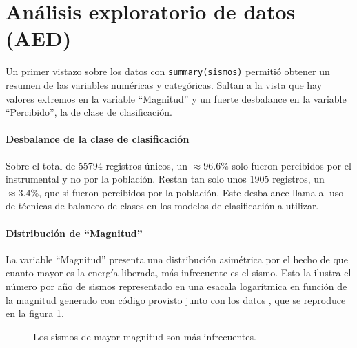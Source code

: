 \documentclass[a4paper]{report}
\begin{document}
\section{Análisis exploratorio de datos (AED)}\label{sec:AED}

Un primer vistazo sobre los datos con \verb'summary(sismos)' permitió obtener un resumen de las variables numéricas y categóricas.
Saltan a la vista que hay valores extremos en la variable ``Magnitud'' y un fuerte desbalance en la variable ``Percibido'', la de clase de clasificación.

\paragraph{Desbalance de la clase de clasificación}
Sobre el total de 55794 registros únicos, un \(\approx 96.6\%\) solo fueron percibidos por el instrumental y no por la población.
Restan tan solo unos 1905 registros, un \(\approx 3.4\%\), que si fueron percibidos por la población.
Este desbalance llama al uso de técnicas de balanceo de clases en los modelos de clasificación a utilizar.

\paragraph{Distribución de ``Magnitud''}
La variable ``Magnitud'' presenta una distribución asimétrica por el hecho de que cuanto mayor es la energía liberada, más infrecuente es el sismo.
Esto la ilustra el número por año de sismos representado en una esacala logarítmica en función de la magnitud generado con código provisto junto con los datos \cite[sección 4.2.1]{daniela_parada_ic-datasets-docencia_nodate}, que se reproduce en la figura \ref{fig:acumulado_anual_magnitud}.


\begin{figure}[!h]
\centering

\caption{Los sismos de mayor magnitud son más infrecuentes.}
\label{fig:acumulado_anual_magnitud}
\end{figure}
\end{document}
